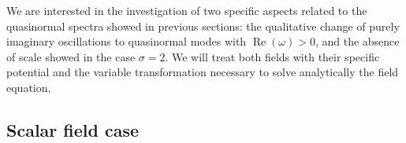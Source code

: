 \documentclass[preprint]{revtex4-1}
\renewcommand{\Re}{\operatorname{Re}}
\begin{document}
We are interested in the investigation of two specific aspects related to the quasinormal spectra showed in previous sections:  the qualitative change of purely imaginary oscillations to quasinormal modes with $\Re(\omega)>0$, and the absence of scale showed in the case $\sigma =2$. We will treat both fields with their specific potential and the variable transformation necessary to solve analytically the field equation.


\subsection*{Scalar field case}
\end{document}
